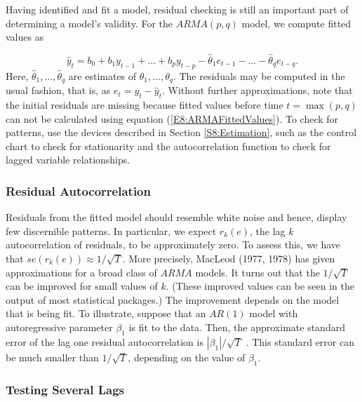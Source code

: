 Having identified and fit a model, residual checking is still an important
part of determining a model's validity. For the $ARMA(p,q)$ model, we
compute fitted values as

\begin{equation}\label{E8:ARMAFittedValues}
\widehat{y}_t = b_0 + b_1 y_{t-1} + \ldots + b_p y_{t-p} -
\widehat{\theta}_1 e_{t-1}- \ldots - \widehat{\theta }_q e_{t-q}.
\end{equation}
Here, $\widehat{\theta}_1, \ldots, \widehat{\theta}_q$ are estimates
of $\theta_1,\ldots, \theta_q$. The residuals may be computed in the
usual fashion, that is, as $e_t=y_t-\widehat{y}_t$. Without further
approximations, note that the initial residuals are missing because
fitted values before time $t=\max (p,q)$ can not be calculated using
equation (\ref{E8:ARMAFittedValues}). To check for patterns, use the
devices described in Section \ref{S8:Estimation}, such as the
control chart to check for stationarity and the autocorrelation
function to check for lagged variable relationships.

\subsubsection*{Residual Autocorrelation}

Residuals from the fitted model should resemble white noise and
hence, display few discernible patterns. In particular, we expect
$r_k(e)$, the lag $k$ autocorrelation of residuals, to be
approximately zero. To assess this, we have that $se\left( r_k(e)
\right) \approx 1/\sqrt{T}$. More precisely, MacLeod (1977, 1978)
has given approximations for a broad class of $ARMA$ models. It
turns out that the $1/\sqrt{T}$ can be improved for small values of
$k$. (These improved values can be seen in the output of most
statistical packages.) The improvement depends on the model that is
being fit. To illustrate, suppose that an $AR(1)$ model with
autoregressive parameter $\beta_1$ is fit to the data. Then, the
approximate standard error of the lag one residual autocorrelation
is $|\beta_1|/\sqrt{T}$ . This standard error can be much smaller
than $1/\sqrt{T}$, depending on the value of $\beta_1$.

\subsubsection*{Testing Several Lags}

